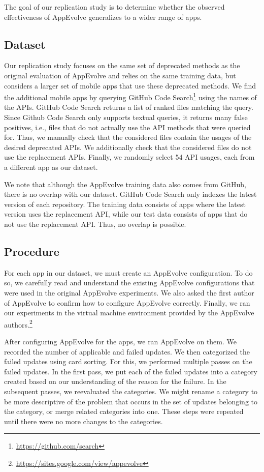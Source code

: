 The goal of our replication study is to determine whether the observed
effectiveness of AppEvolve generalizes to a wider range of apps.

\subsection{Dataset}
Our replication study focuses on the same set of deprecated methods as the
original evaluation of AppEvolve and relies on the same training data, but
considers a larger set of mobile apps that use these deprecated methods.
We find the additional mobile apps by querying GitHub Code
Search\footnote{\url{https://github.com/search}} using the names of the
APIs. GitHub Code Search returns a list of ranked files matching the
query. Since Github Code Search only supports textual queries, it returns
many false positives, i.e., files that do not actually use the API methods
that were queried for.  Thus, we manually check that the considered files
contain the usages of the desired deprecated APIs.  We additionally check
that the considered files do not use the replacement APIs. Finally, we
randomly select 54 API usages, each from a different app as our
dataset.  %

We note that although the AppEvolve training data also comes from GitHub,
there is no overlap with our dataset.  GitHub Code Search only
indexes the latest version of each repository.  The training data consists
of apps where the latest version uses the replacement API, while our test
data consists of apps that do not use the replacement API.  Thus, no
overlap is possible.

\subsection{Procedure}
For each app in our dataset, we must create an AppEvolve configuration. To
do so, we carefully read and understand the existing AppEvolve
configurations that were used in the original AppEvolve experiments. We
also asked the first author of AppEvolve to confirm how to configure
AppEvolve correctly. Finally, we ran our experiments in the virtual machine
environment provided by the AppEvolve
authors.\footnote{\url{https://sites.google.com/view/appevolve}}

After configuring AppEvolve for the apps, we ran AppEvolve on them. We
recorded the number of applicable and failed updates. We then categorized
the failed updates using card sorting\cite{...}. For this, we performed
multiple passes on the failed updates. In the first pass, we put each
of the failed updates into a category created based on our understanding of
the reason for the failure. In the subsequent passes, we reevaluated the
categories. We might rename a category to be more descriptive of the
problem that occurs in the set of updates belonging to the category, or
merge related categories into one. These steps were repeated until there
were no more changes to the categories.
